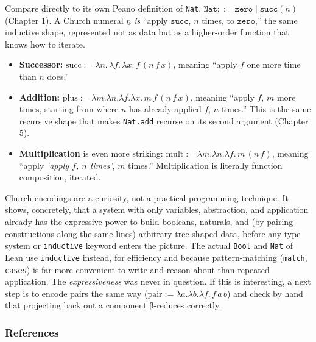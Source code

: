 Compare directly to its own Peano definition of \texttt{Nat}, \(\mathtt{Nat} ::= \mathtt{zero} \mid \mathtt{succ}(n)\) (Chapter 1). A Church numeral \(\underline{n}\) \emph{is} ``apply \(\mathtt{succ}\), \(n\) times, to \(\mathtt{zero}\),'' the same inductive shape, represented not as data but as a higher-order function that knows how to iterate.

\begin{itemize}
\tightlist
\item
  \textbf{Successor:} \(\mathrm{succ} := \lambda n.\, \lambda f.\, \lambda x.\,
  f\,(n\, f\, x)\), meaning ``apply \(f\) one more time than \(n\) does.''
\item
  \textbf{Addition:} \(\mathrm{plus} := \lambda m.\lambda n.\lambda f.\lambda x.\,
  m\, f\,(n\, f\, x)\), meaning ``apply \(f\), \(m\) more times, starting from where \(n\) has already applied \(f\), \(n\) times.'' This is the same recursive shape that makes \texttt{Nat.add} recurse on its second argument (Chapter 5).
\item
  \textbf{Multiplication} is even more striking: \(\mathrm{mult} := \lambda m.
  \lambda n.\lambda f.\, m\,(n\, f)\), meaning ``apply \emph{`apply \(f\), \(n\) times'}, \(m\) times.'' Multiplication is literally function composition, iterated.
\end{itemize}

Church encodings are a curiosity, not a practical programming technique. It shows, concretely, that a system with only variables, abstraction, and application already has the expressive power to build booleans, naturals, and (by pairing constructions along the same lines) arbitrary tree-shaped data, before any type system or \texttt{inductive} keyword enters the picture. The actual \texttt{Bool} and \texttt{Nat} of Lean use \texttt{inductive} instead, for efficiency and because pattern-matching (\texttt{match}, \href{https://lean-lang.org/doc/reference/latest/Tactic-Proofs/Tactic-Reference/}{\texttt{cases}}) is far more convenient to write and reason about than repeated application. The \emph{expressiveness} was never in question. If this is interesting, a next step is to encode pairs the same way (\(\mathrm{pair} := \lambda a.\lambda b.\lambda f.\,
f\, a\, b\)) and check by hand that projecting back out a component β-reduces correctly.

\subsubsection{References}\label{sec:14-next-steps:03-next-projects:8}

